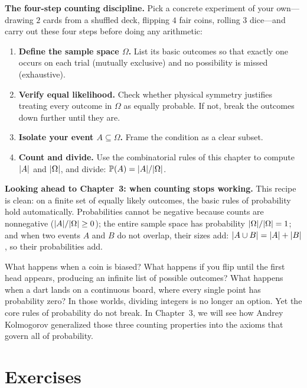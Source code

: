 \begin{labbox}
\textbf{The four-step counting discipline.} Pick a concrete experiment of your own---drawing
$2$ cards from a shuffled deck, flipping $4$ fair coins, rolling $3$ dice---and carry out
these four steps before doing any arithmetic:
\begin{enumerate}
  \item \textbf{Define the sample space $\Omega$.} List its basic outcomes so that exactly one
        occurs on each trial (mutually exclusive) and no possibility is missed (exhaustive).
  \item \textbf{Verify equal likelihood.} Check whether physical symmetry justifies treating
        every outcome in $\Omega$ as equally probable. If not, break the outcomes down further
        until they are.
  \item \textbf{Isolate your event $A \subseteq \Omega$.} Frame the condition as a clear subset.
  \item \textbf{Count and divide.} Use the combinatorial rules of this chapter to compute
        $\lvert A\rvert$ and $\lvert\Omega\rvert$, and divide: $\operatorname{\mathbb{P}}(A) = \lvert A\rvert/\lvert\Omega\rvert$.
\end{enumerate}

\textbf{Looking ahead to Chapter~3: when counting stops working.}
This recipe is clean: on a finite set of equally likely outcomes, the basic
rules of probability hold automatically. Probabilities cannot be negative because counts are
nonnegative ($\lvert A\rvert/\lvert\Omega\rvert \ge 0$); the entire sample space has probability
$\lvert\Omega\rvert/\lvert\Omega\rvert = 1$; and when two events $A$ and $B$ do not overlap, their sizes
add: $\lvert A \cup B\rvert = \lvert A\rvert + \lvert B\rvert$, so their probabilities add.

What happens when a coin is biased? What happens if you flip until the first head appears,
producing an infinite list of possible outcomes? What happens when a dart lands on a
continuous board, where every single point has probability zero? In those worlds, dividing
integers is no longer an option. Yet the core rules of probability do not break.
In Chapter~3, we will see how Andrey Kolmogorov generalized those three counting
properties into the axioms that govern all of probability.
\end{labbox}

\section{Exercises}
\label{ch2:exercises}

